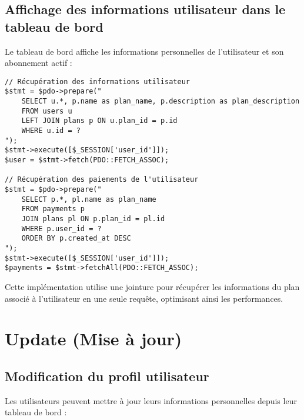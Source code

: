\documentclass[12pt,a4paper]{report}
\begin{document}
\subsection{Affichage des informations utilisateur dans le tableau de bord}
Le tableau de bord affiche les informations personnelles de l'utilisateur et son abonnement actif :

\begin{lstlisting}[style=phpStyle, caption=Extrait de dashboard.php - Lecture des informations utilisateur]
// Récupération des informations utilisateur
$stmt = $pdo->prepare("
    SELECT u.*, p.name as plan_name, p.description as plan_description 
    FROM users u
    LEFT JOIN plans p ON u.plan_id = p.id
    WHERE u.id = ?
");
$stmt->execute([$_SESSION['user_id']]);
$user = $stmt->fetch(PDO::FETCH_ASSOC);

// Récupération des paiements de l'utilisateur
$stmt = $pdo->prepare("
    SELECT p.*, pl.name as plan_name
    FROM payments p
    JOIN plans pl ON p.plan_id = pl.id
    WHERE p.user_id = ?
    ORDER BY p.created_at DESC
");
$stmt->execute([$_SESSION['user_id']]);
$payments = $stmt->fetchAll(PDO::FETCH_ASSOC);
\end{lstlisting}

Cette implémentation utilise une jointure pour récupérer les informations du plan associé à l'utilisateur en une seule requête, optimisant ainsi les performances.

\section{Update (Mise à jour)}

\subsection{Modification du profil utilisateur}
Les utilisateurs peuvent mettre à jour leurs informations personnelles depuis leur tableau de bord :
\end{document}
